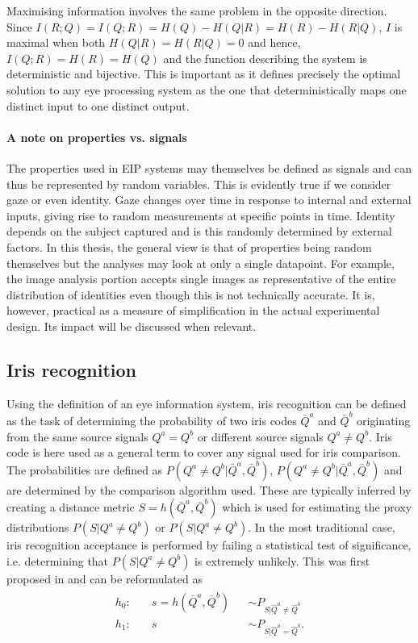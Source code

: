 Maximising information involves the same problem in the opposite direction. Since $I(R;Q) = I(Q; R) = H(Q) - H(Q|R) = H(R) - H(R|Q)$, $I$ is maximal when both $H(Q|R)=H(R|Q)=0$ and hence, $I(Q;R)=H(R)=H(Q)$ and the function describing the system is deterministic and bijective. This is important as it defines precisely the optimal solution to any eye processing system as the one that deterministically maps one distinct input to one distinct output.

\paragraph{A note on properties vs. signals}
The properties used in EIP systems may themselves be defined as signals and can thus be represented by random variables. This is evidently true if we consider gaze or even identity. Gaze changes over time in response to internal and external inputs, giving rise to random measurements at specific points in time. Identity depends on the subject captured and is this randomly determined by external factors. In this thesis, the general view is that of properties being random themselves but the analyses may look at only a single datapoint. For example, the image analysis portion accepts single images as representative of the entire distribution of identities even though this is not technically accurate. It is, however, practical as a measure of simplification in the actual experimental design. Its impact will be discussed when relevant.

\subsection{Iris recognition}
Using the definition of an eye information system, iris recognition can be defined as the task of determining the probability of two iris codes $\bar{Q}^a$ and $\bar{Q}^b$ originating from the same source signals $Q^a = Q^b$ or different source signals $Q^a\neq Q^b$. Iris code is here used as a general term to cover any signal used for iris comparison. The probabilities are defined as $P(Q^a\neq Q^b|\bar{Q}^a, \bar{Q}^b)$, $P(Q^a\neq Q^b|\bar{Q}^a, \bar{Q}^b)$ and are determined by the comparison algorithm used. These are typically inferred by creating a distance metric $S = h(\bar{Q}^a, \bar{Q}^b)$ which is used for estimating the proxy distributions $P(S|Q^a\neq Q^b)$ or $P(S|Q^a\neq Q^b)$. In the most traditional case, iris recognition acceptance is performed by failing a statistical test of significance, i.e. determining that $P(S|Q^a\neq Q^b)$ is extremely unlikely. This was first proposed in \cite{DAUGMAN_IRIS_ORIG} and can be reformulated as
\begin{align}
\begin{aligned}
    h_0: & \quad s = h(\bar{Q}^a, \bar{Q}^b) &&\sim  P_{S|\hat{Q}^a\neq \hat{Q}^b}\\
    h_1: & \quad s && \sim  P_{S|\hat{Q}^a = \hat{Q}^b}.
\end{aligned}
\end{align}

